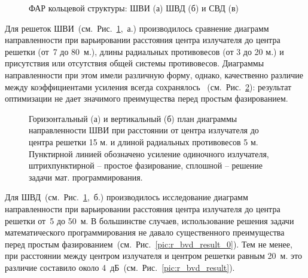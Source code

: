 \begin{figure}
    \begin{minipage}[h]{0.49\linewidth}
    \end{minipage}
    \hfill
    \begin{minipage}[h]{0.49\linewidth}
    \end{minipage}
    \begin{minipage}[h]{1\linewidth}
    \end{minipage}
    \caption{ФАР кольцевой структуры: ШВИ (а) ШВД (б) и СВД (в)}
    \label{pic:r_paas}
\end{figure}

Для решеток ШВИ~(см.~Рис.~\ref{pic:r_paas},~а.) производилось сравнение диаграмм направленности при варьировании расстояния центра излучателя до центра решетки (от~7 до 80~м.), длины радиальных противовесов (от 3 до 20 м.) и присутствия или отсутствия общей системы противовесов. Диаграммы направленности при этом имели различную форму, однако, качественно различие между коэффициентами усиления всегда сохранялось ~(см.~Рис.~\ref{pic:r_bve_result}): результат оптимизации не дает значимого преимущества перед простым фазированием.

\begin{figure}
\begin{minipage}[h]{0.49\linewidth}
\end{minipage}
\hfill
\begin{minipage}[h]{0.49\linewidth}
\end{minipage}
\caption{Горизонтальный (а) и вертикальный (б) план диаграммы направленности ШВИ при расстоянии от центра излучателя до центра решетки 15 м. и длиной радиальных противовесов 5 м. Пунктирной линией обозначено усиление одиночного излучателя, штрихпунктирной – простое фазирование, сплошной – решение задачи мат. программирования.}
\label{pic:r_bve_result}
\end{figure}

Для ШВД~(см.~Рис.~\ref{pic:r_paas},~б.) производилось исследование диаграмм направленности при варьировании расстояния центра излучателя до центра решетки от~5 до 50~м. В большинстве случаев, использование решения задачи математического программирования не давало существенного преимущества перед простым фазированием~(см.~Рис.~\ref{pic:r_bvd_result_0}). Тем не менее, при расстоянии между центром излучателя и центром решетки равным 20~м. это различие составило около 4~дБ~(см.~Рис.~\ref{pic:r_bvd_result}).

